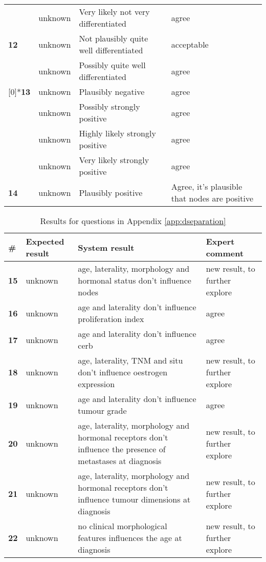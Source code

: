 \begin{table}[h]
\begin{tabularx}{\textwidth}{lllX}
		 \multirow{3}[0]{*}{\textbf{12}} & unknown & Very likely not very differentiated & agree \\
		      & unknown & Not plausibly quite well differentiated & acceptable \\
		      & unknown & Possibly quite well differentiated & agree \\
	      \addlinespace
		 \multirow{4}[0]{*}{\textbf{13}} & unknown & Plausibly negative & agree \\
		      & unknown & Possibly strongly positive & agree \\
		      & unknown & Highly likely strongly positive & agree \\
		      & unknown & Very likely strongly positive & agree \\
		\addlinespace
		\textbf{14} & unknown & Plausibly positive & Agree, it's plausible that nodes are positive \\
		\bottomrule
		\end{tabularx}
	\label{tab:resultsconditionalquestions}
\end{table}

\begin{table}[h]
	\centering
	\caption{Results for questions in Appendix \ref{app:dseparation}}
	\begin{tabularx}{\textwidth}{llXX}
		\toprule
		\textbf{\#} & Expected result & System result & Expert comment  \\
		\midrule	
		\textbf{15} & unknown & age, laterality, morphology and hormonal status don't influence nodes & new result, to further explore \\
		\addlinespace
		\textbf{16} & unknown & age and laterality don't influence proliferation index & agree \\
		\addlinespace
		\textbf{17} & unknown & age and laterality don't influence cerb & agree \\
		\addlinespace
		\textbf{18} & unknown & age, laterality, TNM and situ don't influence oestrogen expression & new result, to further explore \\
		\addlinespace
		\textbf{19} & unknown & age and laterality don't influence tumour grade & agree \\
		\addlinespace
		\textbf{20} & unknown & age, laterality, morphology and hormonal receptors don't influence the presence of metastases at diagnosis & new result, to further explore \\
		\addlinespace
		\textbf{21} & unknown & age, laterality, morphology and hormonal receptors don't influence tumour dimensions at diagnosis & new result, to further explore \\
		\addlinespace
		\textbf{22} & unknown & no clinical morphological features influences the age at diagnosis & new result, to further explore \\
		\bottomrule
		\end{tabularx}
	\label{tab:resultsdseparationquestions}
\end{table}

